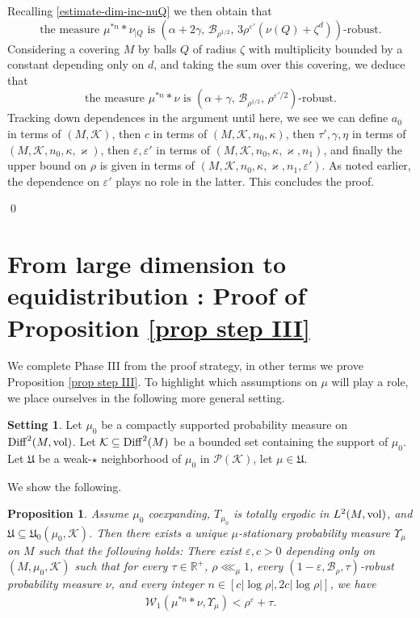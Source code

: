 \documentclass[11pt, leqno, fleqn]{amsart}
\def\cU{\mathfrak U}
\def\cW{\mathcal W}
\def\eps{\varepsilon}
\newcommand{\margem}[1]{\marginpar{{\scriptsize {#1}}}}
\def\cB{          \mathcal B}
\def\clo{   \color{orange}}
\def \R{{\mathbb R}}
\newcommand{\cP}{{\mathcal P}}
\newcommand{\cK}{{\mathcal K}}
\newcommand{\aryst}{\begin{eqnarray*}}
\newcommand{\earyst}{\end{eqnarray*}}
\newtheorem{prop}[thm]{\bf Proposition}
\theoremstyle{definition}
\newtheorem{setting}[thm]{\bf Setting}
\theoremstyle{definition}
\def \vol{  {\rm vol} }
\newcommand{\Diff}{{\rm Diff}}
\begin{document}
     	Recalling \eqref{estimate-dim-inc-nuQ} we then obtain that 
	$$\text{the  measure $\mu^{*n}*\nu_{|Q}$ is $(\alpha+2\gamma, \,\cB_{\rho^{1/2}},\,3 \rho^{\eps'}(\nu(Q) +\zeta^d))$-robust.}$$
	Considering a covering $M$ by balls $Q$ of radius $\zeta$  with multiplicity bounded by a constant depending only on $d$, and taking the sum over this covering, we deduce that 
	$$\text{the  measure $\mu^{*n}*\nu$ is $(\alpha+\gamma, \,\cB_{\rho^{1/2}},\, \rho^{\eps'/2})$-robust.}$$
	Tracking down dependences in the argument until here, we see we can define $a_{0}$ in terms of $(M,\cK)$, then $c$ in terms of $(M, \cK, n_{0}, \kappa)$, then $\tau', \gamma, \eta$ in terms of $(M, \cK, n_{0}, \kappa, \varkappa)$,  then $\eps, \eps'$ in terms of $(M, \cK, n_{0}, \kappa, \varkappa, n_{1})$, and finally the upper bound on $\rho$ is given in terms of $(M, \cK, n_{0}, \kappa, \varkappa, n_{1},\eps')$. As noted earlier, the dependence on $\eps'$ plays no role in the latter. 
	This concludes the proof.
	
	\qed
	
	
				
	\section{From large dimension to equidistribution : Proof of Proposition \ref{prop step III}}  \label{sec proof prop step III}
	
   We complete Phase III from the proof strategy, in other terms we prove Proposition \ref{prop step III}. To highlight which assumptions on $\mu$ will play a role, we place ourselves in  the following more general setting. 
  


\begin{setting} 
	Let   $\mu_0$ be a compactly supported probability measure on $\Diff^2(M, \vol)$. 
	Let $\cK\subseteq \Diff^2(M)$ be a bounded set containing the support of $\mu_{0}$. Let $\cU$ be a weak-$\star$ neighborhood of $\mu_{0}$ in $\cP(\cK)$, let $\mu\in \cU$. 
\end{setting}


We show the following.  %

    \begin{prop} \label{prop step III-gen}  
    Assume  $\mu_{0}$ coexpanding, $T_{\mu_0}$ is totally ergodic in $L^2(M, \vol)$, and $\cU\subseteq \cU_{0}(\mu_{0},\cK)$. Then there exists a  unique $\mu$-stationary probability measure $\Upsilon_{\mu}$ on $M$ such that
    the following holds:
  There exist $\eps, c > 0$ depending only on $(M,\mu_{0}, \cK)$ such that    for every $\tau \in \R^+$, $\rho \lll_{ \mu } 1$,    every $(1 - \eps, \cB_{\rho}, \tau)$-robust probability measure $\nu$, and every integer $n \in [c  | \log \rho|, 2c | \log \rho | ]$, we have  
  	\aryst
  	\cW_1(\mu^{* n} * \nu, \Upsilon_{\mu} ) < \rho^{\eps} + \tau.
  	\earyst
      \end{prop}
\end{document}
